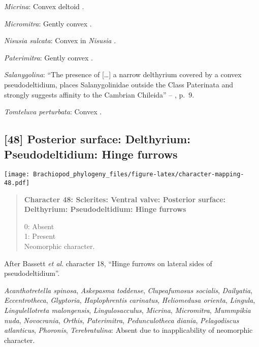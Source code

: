 \documentclass[openany]{book}
\theoremstyle{definition}
\theoremstyle{definition}
\theoremstyle{definition}
\theoremstyle{remark}
\begin{document}
\hypertarget{Micrina-coding-47}{}
\emph{Micrina}: Convex deltoid \citep{Holmer2008TheEarly}.

\hypertarget{Micromitra-coding-47}{}
\emph{Micromitra}: Gently convex \citep[see][fig.
83.3]{Williams2000LinguliformeaCraniiformea}.

\hypertarget{Nisusia_sulcata-coding-47}{}
\emph{Nisusia sulcata}: Convex in \emph{Nisusia} \citep[see][fig.
8.4]{Rowell1985Theevolutionary}.

\hypertarget{Paterimitra-coding-47}{}
\emph{Paterimitra}: Gently convex \citep[see][fig.
83.1]{Williams2000LinguliformeaCraniiformea}.

\hypertarget{Salanygolina-coding-47}{}
\emph{Salanygolina}: ``The presence of {[}\ldots{}{]} a narrow
delthyrium covered by a convex pseudodeltidium, places Salanygolinidae
outside the Class Paterinata and strongly suggests affinity to the
Cambrian Chileida'' -- \citet{Holmer2009Theenigmatic}, p.~9.

\hypertarget{Tomteluva_perturbata-coding-47}{}
\emph{Tomteluva perturbata}: Convex \citep{Streng2016Anew}.

\subsection*{{[}48{]} Posterior surface: Delthyrium: Pseudodeltidium:
Hinge
furrows}\label{posterior-surface-delthyrium-pseudodeltidium-hinge-furrows}

\texttt{[image: Brachiopod\_phylogeny\_files/figure-latex/character-mapping-48.pdf]}

\begin{quote}
\textbf{Character 48: Sclerites: Ventral valve: Posterior surface:
Delthyrium: Pseudodeltidium: Hinge furrows}

0: Absent\\
1: Present\\
Neomorphic character.
\end{quote}

After Bassett \emph{et al}.
\citeyearpar{Bassett2001Functionalmorphology} character 18, ``Hinge
furrows on lateral sides of pseudodeltidium''.

\hypertarget{Acanthotretella_spinosa-coding-48}{}
\emph{Acanthotretella spinosa}, \emph{Askepasma toddense},
\emph{Clupeafumosus socialis}, \emph{Dailyatia}, \emph{Eccentrotheca},
\emph{Glyptoria}, \emph{Haplophrentis carinatus}, \emph{Heliomedusa
orienta}, \emph{Lingula}, \emph{Lingulellotreta malongensis},
\emph{Lingulosacculus}, \emph{Micrina}, \emph{Micromitra},
\emph{Mummpikia nuda}, \emph{Novocrania}, \emph{Orthis},
\emph{Paterimitra}, \emph{Pedunculotheca diania}, \emph{Pelagodiscus
atlanticus}, \emph{Phoronis}, \emph{Terebratulina}: Absent due to
inapplicability of neomorphic character.
\end{document}
